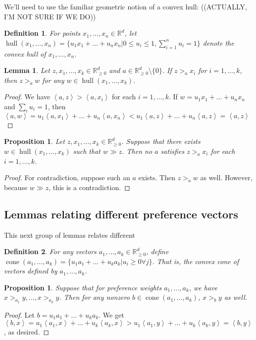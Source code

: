 \documentclass[12pt]{article}
\newtheorem*{definition}{Definition}
\newtheorem{proposition}[theorem]{Proposition}
\newtheorem{lemma}[theorem]{Lemma}
\newcommand{\R}{\mathbb{R}}
\newcommand{\Rgz}{\mathbb{R}_{\ge 0}}
\newcommand{\ip}[2]{\left\langle{#1},{#2}\right\rangle}
\DeclareMathOperator*{\cone}{cone}
\DeclareMathOperator*{\hull}{hull}
\newcommand{\1}[1]{\mathds{1}[{#1}]}
\begin{document}
    We'll need to use the familiar geometric notion of a convex hull:
    ((ACTUALLY, I'M NOT SURE IF WE DO))
    \begin{definition}
      For points $x_1,\ldots,x_n \in \R^d$, let $\hull(x_1,\ldots,x_n)
      = \{u_1x_1 + \ldots + u_nx_n | 0\le u_i\le 1, \sum_{i=1}^n u_i = 1\}$
      denote the convex hull of $x_1,\ldots,x_n$.
    \end{definition}
    \begin{lemma}
      Let $z,x_1,\ldots,x_k \in \Rgz^d$ and $a\in \Rgz^d \setminus \{0\}$.
      If $z >_a x_i$ for $i=1,\ldots,k$, then $z >_a w$
      for any $w\in \hull(x_1,\ldots,x_k)$.
    \end{lemma}
    \begin{proof}
      We have $\ip{a}{z} > \ip{a}{x_i}$ for each $i=1,\ldots,k$.
      If $w = u_1x_1+ \ldots + u_nx_n$ and $\sum_i u_i =1$, then
      $\ip{a}{w} = u_1\ip{a}{x_1}+\ldots+u_n\ip{a}{x_n}
      < u_1\ip{a}{z} + \ldots + u_n\ip{a}{z} = \ip{a}{z}$
    \end{proof}
    \begin{proposition}
      Let $z,x_1,\ldots,x_k \in \Rgz^d$.
      Suppose that there exists $w\in \hull(x_1,\ldots,x_k)$
      such that $w \gg z$.
      Then no $a$ satisfies $z >_a x_i$ for each $i=1,\ldots, k$.
    \end{proposition}
    \begin{proof}
      For contradiction, suppose such an $a$ exists.
      Then $z >_a w$ as well. However, because $w \gg z$,
      this is a contradiction.
    \end{proof}

  \subsection{Lemmas relating different preference vectors}
    This next group of lemmas relates different 

    \begin{definition}
      For any vectors $a_1,\ldots, a_k \in \Rgz^d$, define
      $\cone(a_1,\ldots,a_k) = \{ u_1a_1 + \ldots + u_ka_k | u_i\ge 0 \forall j\}$.
      That is, the convex cone of vectors defined by $a_1,\ldots,a_k$.
    \end{definition}
    \begin{proposition}
      Suppose that for preference weights $a_1,\ldots, a_k$,
      we have $x >_{a_1} y, \ldots, x >_{a_k} y$.
      Then for any nonzero $b\in \cone(a_1,\ldots, a_k)$,
      $x >_b y$ as well.
    \end{proposition}
    \begin{proof}
      Let $b = u_1a_1+ \ldots + u_ka_k$.
      We get $\ip{b}{x} = u_1\ip{a_1}{x} + \ldots + u_k\ip{a_k}{x}
      > u_1\ip{a_1}{y} + \ldots + u_k\ip{a_k}{y} = \ip{b}{y}$,
      as desired.
    \end{proof}
\end{document}
